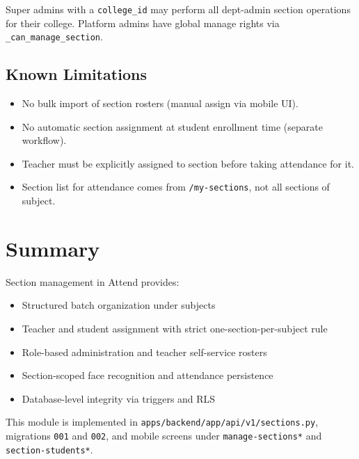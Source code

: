 \documentclass[11pt,a4paper,oneside]{report}
\begin{document}
Super admins with a \texttt{college\_id} may perform all dept-admin section operations for their college. Platform admins have global manage rights via \texttt{\_can\_manage\_section}.

\section{Known Limitations}

\begin{itemize}[leftmargin=1.5em]
  \item No bulk import of section rosters (manual assign via mobile UI).
  \item No automatic section assignment at student enrollment time (separate workflow).
  \item Teacher must be explicitly assigned to section before taking attendance for it.
  \item Section list for attendance comes from \texttt{/my-sections}, not all sections of subject.
\end{itemize}

\chapter{Summary}
\label{ch:summary}

Section management in Attend provides:
\begin{itemize}[leftmargin=1.5em]
  \item Structured batch organization under subjects
  \item Teacher and student assignment with strict one-section-per-subject rule
  \item Role-based administration and teacher self-service rosters
  \item Section-scoped face recognition and attendance persistence
  \item Database-level integrity via triggers and RLS
\end{itemize}

This module is implemented in \texttt{apps/backend/app/api/v1/sections.py}, migrations \texttt{001} and \texttt{002}, and mobile screens under \texttt{manage-sections*} and \texttt{section-students*}.
\end{document}
